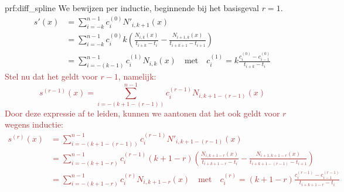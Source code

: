 \begin{prf}{prf:diff_spline}
    We bewijzen per inductie, beginnende bij het basisgeval $r=1$. 
    \begin{align*}
        s'(x) 
            &= \sum_{i=-k}^{n-1}c_i^{(0)}N'_{i,k+1}(x) \\
            &= \sum_{i=-k}^{n-1}c_i^{(0)}k
                \left(
                    \frac{N_{i,k}(x)}{t_{i+k}-t_i} - \frac{N_{i+1,k}(x)}{t_{i+k+1}-t_{i+1}}
                \right) \\
            &= \sum_{i=-(k-1)}^{n-1}c_i^{(1)}N_{i,k}(x) \quad \text{met} \quad c_i^{(1)} = k \frac{c_i^{(0)} - c_{i-1}^{(0)}}{t_{i+k} - t_i}
    \end{align*}
    \textcolor{brown}{
        Stel nu dat het geldt voor $r - 1$, namelijk:
        \begin{equation*}
            s^{(r-1)}(x) = \sum_{i=-(k+1-(r-1))}^{n-1}c_i^{(r-1)}N_{i,k+1-(r-1)}(x)
        \end{equation*} 
        Door deze expressie af te leiden, kunnen we aantonen dat het ook geldt voor $r$ wegens inductie:
        \begin{align*}
            s^{(r)}(x)
                &= \sum_{i=-(k+1-(r-1))}^{n-1}c_i^{(r-1)}N'_{i,k+1-(r-1)}(x) \\
                &= \sum_{i=-(k+1-r)}^{n-1}c_i^{(r-1)}(k+1-r)
                \left(
                    \frac{N_{i,k+1-r}(x)}{t_{i+k+1-r}-t_i} - \frac{N_{i+1,k+1-r}(x)}{t_{i+k+1-(r-1)}-t_{i+1}}
                \right) \\
                &= \sum_{i=-(k+1-r)}^{n-1}c_i^{(r)}
                N_{i,k+1-r}(x) \quad \text{met} \quad c_i^{(r)} =(k+1-r) \frac{c_i^{(r-1)} - c_{i-1}^{(r-1)}}{t_{i+k+1-r} - t_i}
        \end{align*}
    }
\end{prf}